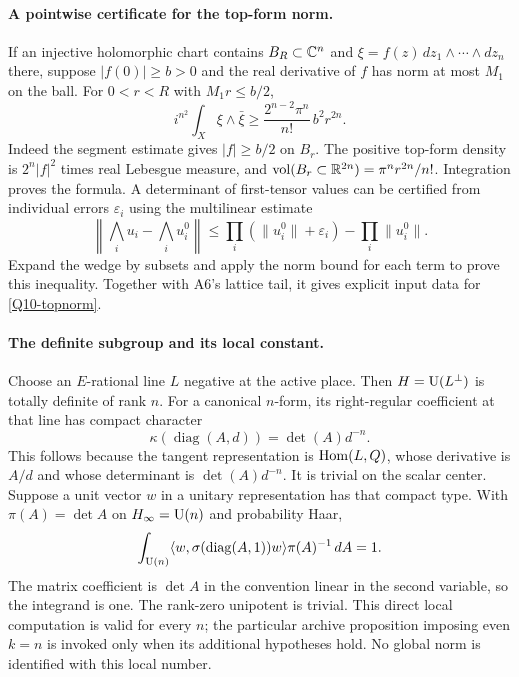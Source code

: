 \documentclass[11pt]{article}
\theoremstyle{definition}\newtheorem{definition}[theorem]{Definition}\newtheorem{remark}[theorem]{Remark}
\begin{document}
\paragraph{A pointwise certificate for the top-form norm.}
If an injective holomorphic chart contains $B_R\subset\mathbb C^n$ and
$\xi=f(z)\,dz_1\wedge\cdots\wedge dz_n$ there, suppose
$|f(0)|\geq b>0$ and the real derivative of $f$ has norm at most
$M_1$ on the ball. For $0<r<R$ with $M_1r\leq b/2$,
\begin{equation}\label{Q10-topnorm}
 i^{n^2}\int_X\xi\wedge\bar\xi
       \geq \frac{2^{n-2}\pi^n}{n!}\,b^2r^{2n}.
\end{equation}
Indeed the segment estimate gives $|f|\geq b/2$ on $B_r$.
The positive top-form density is $2^n|f|^2$ times real
Lebesgue measure, and
$\operatorname{vol}(B_r\subset\mathbb R^{2n})=\pi^nr^{2n}/n!$.
Integration proves the formula. A determinant of first-tensor
values can be certified from individual errors $\varepsilon_i$
using the multilinear estimate
\[
 \left\|\bigwedge_i u_i-\bigwedge_i u_i^0\right\|
 \leq\prod_i(\|u_i^0\|+\varepsilon_i)-\prod_i\|u_i^0\|.
\]
Expand the wedge by subsets and apply the norm bound for each
term to prove this inequality. Together with A6's lattice tail,
it gives explicit input data for \eqref{Q10-topnorm}.

\paragraph{The definite subgroup and its local constant.}
Choose an $E$-rational line $L$ negative at the active place.
Then $H=\operatorname{U}(L^\perp)$ is totally definite of rank $n$. For a
canonical $n$-form, its right-regular coefficient at that line
has compact character
\[
 \kappa(\operatorname{diag}(A,d))=\det(A)d^{-n}.
\]
This follows because the tangent representation is
$\operatorname{Hom}(L,Q)$, whose derivative is $A/d$ and whose determinant
is $\det(A)d^{-n}$. It is trivial on the scalar center.
Suppose a unit vector $w$ in a unitary representation has that
compact type. With $\pi(A)=\det A$ on $H_\infty=\operatorname{U}(n)$ and
probability Haar,
\[
 \int_{\operatorname{U}(n)}
   \langle w,\sigma(\operatorname{diag}(A,1))w\rangle
                      \pi(A)^{-1}\,dA=1.
\]
The matrix coefficient is $\det A$ in the convention linear
in the second variable, so the integrand is one. The rank-zero
unipotent is trivial. This direct local computation is valid
for every $n$; the particular archive proposition imposing
even $k=n$ is invoked only when its additional hypotheses hold.
No global norm is identified with this local number.
\end{document}
